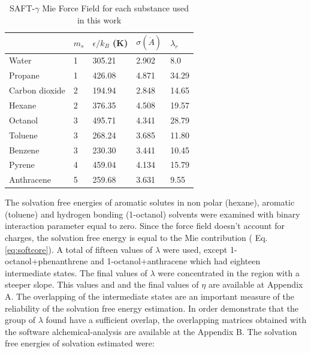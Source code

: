 \begin{table}[h]
\centering
  \caption{SAFT-$\gamma$ Mie Force Field for each substance used in this work}
  \label{tbl:parameters}
  \begin{tabular}{lllll}
  	\hline
  	               & $m_s$ & $\epsilon/k_{B}$ (K) & $\sigma (\dot{A})$ & $\lambda_r$ \\ \hline
  	Water          & 1     & 305.21               & 2.902              & 8.0         \\
  	Propane        & 1     & 426.08               & 4.871              & 34.29       \\
  	Carbon dioxide & 2     & 194.94               & 2.848              & 14.65       \\
  	Hexane         & 2     & 376.35               & 4.508              & 19.57       \\
  	Octanol        & 3     & 495.71               & 4.341              & 28.79       \\
  	Toluene        & 3     & 268.24               & 3.685              & 11.80       \\
  	Benzene        & 3     & 230.30               & 3.441              & 10.45       \\
  	Pyrene         & 4     & 459.04               & 4.134              & 15.79       \\
  	Anthracene     & 5     & 259.68               & 3.631              & 9.55        \\ \hline
  \end{tabular}

\end{table}

The solvation free energies of aromatic solutes in non polar (hexane), aromatic (toluene) and hydrogen bonding (1-octanol) solvents were examined with binary interaction parameter equal to zero. Since the force field doesn't account for charges, the solvation free energy is equal to the Mie contribution ( Eq. \eqref{eq:softcore}). A total of fifteen values of $\lambda$ were used, except 1-octanol+phenanthrene and 1-octanol+anthracene which had eighteen intermediate states. The final values of $\lambda$ were concentrated in the region with a steeper slope. This values and and the final values of $\eta$ are available at  Appendix A. The overlapping of the intermediate states are an important measure of the reliability of the solvation free energy estimation. In order demonstrate that the group of $\lambda$ found have a sufficient overlap, the overlapping matrices obtained with the software alchemical-analysis are available at the Appendix B. The solvation free energies of solvation estimated  were:

